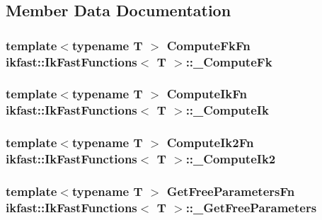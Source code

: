 \subsection{Member Data Documentation}
\hypertarget{classikfast_1_1IkFastFunctions_a5a30a89afe6314eb86a05c3bd5a1a303}{
\subsubsection[{\-\_\-\-Compute\-Fk}]{\setlength{\rightskip}{0pt plus 5cm}template$<$typename T $>$ {\bf Compute\-Fk\-Fn} {\bf ikfast\-::\-Ik\-Fast\-Functions}$<$ T $>$\-::\-\_\-\-Compute\-Fk}}\label{classikfast_1_1IkFastFunctions_a5a30a89afe6314eb86a05c3bd5a1a303}
\hypertarget{classikfast_1_1IkFastFunctions_a75775a9a8c284f52cb6cc473c434163c}{
\subsubsection[{\-\_\-\-Compute\-Ik}]{\setlength{\rightskip}{0pt plus 5cm}template$<$typename T $>$ {\bf Compute\-Ik\-Fn} {\bf ikfast\-::\-Ik\-Fast\-Functions}$<$ T $>$\-::\-\_\-\-Compute\-Ik}}\label{classikfast_1_1IkFastFunctions_a75775a9a8c284f52cb6cc473c434163c}
\hypertarget{classikfast_1_1IkFastFunctions_a80a08b6a3fb3cd0e60e25fc6384d733c}{
\subsubsection[{\-\_\-\-Compute\-Ik2}]{\setlength{\rightskip}{0pt plus 5cm}template$<$typename T $>$ {\bf Compute\-Ik2\-Fn} {\bf ikfast\-::\-Ik\-Fast\-Functions}$<$ T $>$\-::\-\_\-\-Compute\-Ik2}}\label{classikfast_1_1IkFastFunctions_a80a08b6a3fb3cd0e60e25fc6384d733c}
\hypertarget{classikfast_1_1IkFastFunctions_a2c57255d31921839afb1ed5c5f86c7cc}{
\subsubsection[{\-\_\-\-Get\-Free\-Parameters}]{\setlength{\rightskip}{0pt plus 5cm}template$<$typename T $>$ {\bf Get\-Free\-Parameters\-Fn} {\bf ikfast\-::\-Ik\-Fast\-Functions}$<$ T $>$\-::\-\_\-\-Get\-Free\-Parameters}}\label{classikfast_1_1IkFastFunctions_a2c57255d31921839afb1ed5c5f86c7cc}
